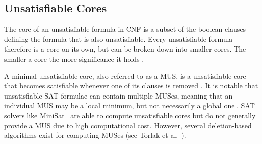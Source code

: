 
\subsection{Unsatisfiable Cores}
The core of an unsatisfiable formula in CNF is a subset of the boolean clauses defining the formula that is also unsatisfiable. Every unsatisfiable formula therefore is a core on its own, but can be broken down into smaller cores. The smaller a core the more significance it holds \cite{10.1007/978-3-540-68237-0_23}. 

A minimal unsatisfiable core, also referred to as a \ac{MUS}, is a unsatisfiable core that becomes satisfiable whenever one of its clauses is removed \cite{dershowitz2006scalable}. It is notable that unsatisfiable SAT formulae can contain multiple MUSes, meaning that an individual MUS may be a local minimum, but not necessarily a global one \cite{liffiton2008algorithms}. SAT solvers like MiniSat~\cite{een2003extensible} are able to compute unsatisfiable cores but do not generally provide a MUS due to high computational cost. However, several deletion-based algorithms exist for computing MUSes (see Torlak et al.~\cite{10.1007/978-3-540-68237-0_23}).